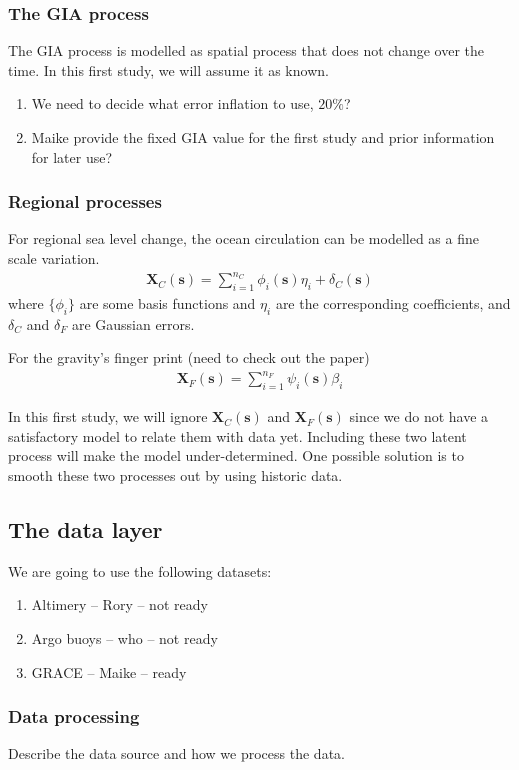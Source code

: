 \documentclass[cmbright,fleqn,referee]{envauth}
\newcommand{\bX}{\bm{X}}
\newcommand{\bs}{\bm{s}}
\begin{document}
\subsubsection{The GIA process}
The GIA process is modelled as spatial process that does not change over the time. In this first study, we will assume it as known. 
\begin{enumerate}
\item We need to decide what error inflation to use, $20\%$?
\item Maike provide the fixed GIA value for the first study and prior information for later use?
\end{enumerate}

\subsubsection{Regional processes}
For regional sea level change, the ocean circulation can be modelled as a fine scale variation.
\begin{align}
\bX_{C}(\bs) = \sum_{i=1}^{n_C} \phi_i(\bs)\eta_i + \delta_{C}(\bs)
\end{align}
where $\{\phi_i\}$ are some basis functions and $\eta_i$ are the corresponding coefficients, and $\delta_C$ and $\delta_F$ are Gaussian errors.

For the gravity's finger print (need to check out the paper) 
\begin{align}
\bX_{F}(\bs) = \sum_{i=1}^{n_F} \psi_i(\bs)\beta_i
\end{align}

In this first study, we will ignore $\bX_C(\bs)$ and $\bX_F(\bs)$ since we do not have a satisfactory model to relate them with data yet. Including these two latent process will make the model under-determined. One possible solution is to smooth these two processes out by using historic data. 

\subsection{The data layer}
We are going to use the following datasets:
\begin{enumerate}
\item Altimery -- Rory -- not ready
\item Argo buoys -- who -- not ready
\item GRACE -- Maike -- ready
\end{enumerate}
\subsubsection{Data processing}
Describe the data source and how we process the data.
\end{document}
